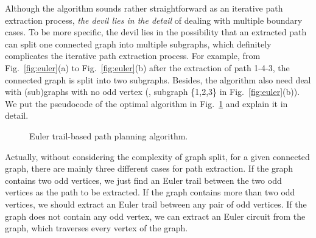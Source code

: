 Although the algorithm sounds rather straightforward as an iterative path extraction process, \emph{the devil lies in the detail} of dealing with multiple boundary cases. To be more specific, the devil lies in the possibility that an extracted path can split one connected graph into multiple subgraphs, which definitely complicates the iterative path extraction process. For example, from Fig.~\ref{fig:euler}(a) to Fig.~\ref{fig:euler}(b) after the extraction of path 1-4-3, the connected graph is split into two subgraphs. Besides, the algorithm also need deal with (sub)graphs with no odd vertex (\eg, subgraph \{1,2,3\} in Fig.~\ref{fig:euler}(b)). We put the pseudocode of the optimal algorithm in Fig.~\ref{fig:algorithm2} and explain it in detail. 

\begin{figure}
\centering
{}
\vspace{-0.35cm}
\caption{Euler trail-based path planning algorithm.}
\label{fig:algorithm2}
\vspace{-0.44cm}
\end{figure} 

Actually, without considering the complexity of graph split, for a given connected graph, there are mainly three different cases for path extraction. If the graph contains two odd vertices, we just find an Euler trail between the two odd vertices as the path to be extracted. If the graph contains more than two odd vertices, we should extract an Euler trail between any pair of odd vertices. If the graph does not contain any odd vertex, we can extract an Euler circuit from the graph, which traverses every vertex of the graph.

